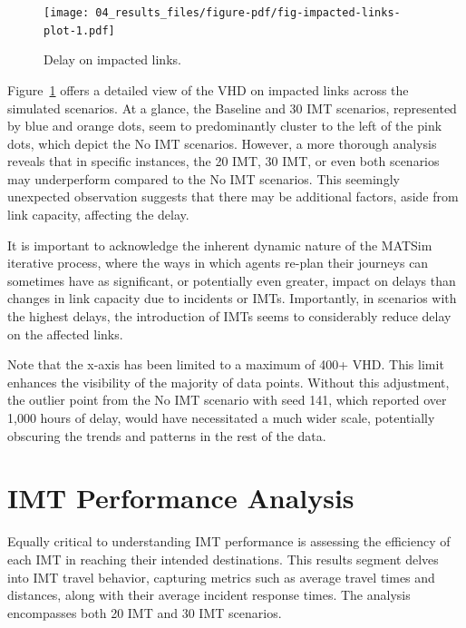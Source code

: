\documentclass[fancy, oneside, mastersfancy, ms]{byuthesis}
\begin{document}
\begin{figure}

{\centering \texttt{[image: 04\_results\_files/figure-pdf/fig-impacted-links-plot-1.pdf]}

}

\caption{\label{fig-impacted-links-plot}Delay on impacted links.}

\end{figure}

Figure~\ref{fig-impacted-links-plot} offers a detailed view of the VHD
on impacted links across the simulated scenarios. At a glance, the
Baseline and 30 IMT scenarios, represented by blue and orange dots, seem
to predominantly cluster to the left of the pink dots, which depict the
No IMT scenarios. However, a more thorough analysis reveals that in
specific instances, the 20 IMT, 30 IMT, or even both scenarios may
underperform compared to the No IMT scenarios. This seemingly unexpected
observation suggests that there may be additional factors, aside from
link capacity, affecting the delay.

It is important to acknowledge the inherent dynamic nature of the MATSim
iterative process, where the ways in which agents re-plan their journeys
can sometimes have as significant, or potentially even greater, impact
on delays than changes in link capacity due to incidents or IMTs.
Importantly, in scenarios with the highest delays, the introduction of
IMTs seems to considerably reduce delay on the affected links.

Note that the x-axis has been limited to a maximum of 400+ VHD. This
limit enhances the visibility of the majority of data points. Without
this adjustment, the outlier point from the No IMT scenario with seed
141, which reported over 1,000 hours of delay, would have necessitated a
much wider scale, potentially obscuring the trends and patterns in the
rest of the data.

\hypertarget{sec-IMT-performance}{%
\section{IMT Performance Analysis}\label{sec-IMT-performance}}

Equally critical to understanding IMT performance is assessing the
efficiency of each IMT in reaching their intended destinations. This
results segment delves into IMT travel behavior, capturing metrics such
as average travel times and distances, along with their average incident
response times. The analysis encompasses both 20 IMT and 30 IMT
scenarios.
\end{document}
